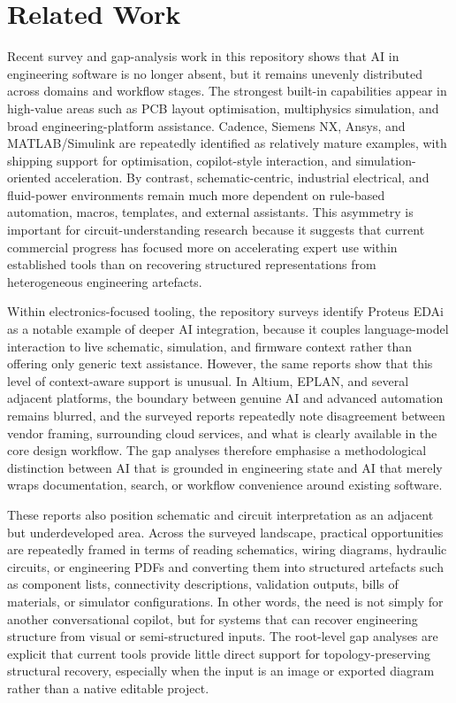 \section{Related Work}

Recent survey and gap-analysis work in this repository shows that AI in engineering software is no longer absent, but it remains unevenly distributed across domains and workflow stages. The strongest built-in capabilities appear in high-value areas such as PCB layout optimisation, multiphysics simulation, and broad engineering-platform assistance. Cadence, Siemens NX, Ansys, and MATLAB/Simulink are repeatedly identified as relatively mature examples, with shipping support for optimisation, copilot-style interaction, and simulation-oriented acceleration. By contrast, schematic-centric, industrial electrical, and fluid-power environments remain much more dependent on rule-based automation, macros, templates, and external assistants. This asymmetry is important for circuit-understanding research because it suggests that current commercial progress has focused more on accelerating expert use within established tools than on recovering structured representations from heterogeneous engineering artefacts.

Within electronics-focused tooling, the repository surveys identify Proteus EDAi as a notable example of deeper AI integration, because it couples language-model interaction to live schematic, simulation, and firmware context rather than offering only generic text assistance. However, the same reports show that this level of context-aware support is unusual. In Altium, EPLAN, and several adjacent platforms, the boundary between genuine AI and advanced automation remains blurred, and the surveyed reports repeatedly note disagreement between vendor framing, surrounding cloud services, and what is clearly available in the core design workflow. The gap analyses therefore emphasise a methodological distinction between AI that is grounded in engineering state and AI that merely wraps documentation, search, or workflow convenience around existing software.

These reports also position schematic and circuit interpretation as an adjacent but underdeveloped area. Across the surveyed landscape, practical opportunities are repeatedly framed in terms of reading schematics, wiring diagrams, hydraulic circuits, or engineering PDFs and converting them into structured artefacts such as component lists, connectivity descriptions, validation outputs, bills of materials, or simulator configurations. In other words, the need is not simply for another conversational copilot, but for systems that can recover engineering structure from visual or semi-structured inputs. The root-level gap analyses are explicit that current tools provide little direct support for topology-preserving structural recovery, especially when the input is an image or exported diagram rather than a native editable project.

